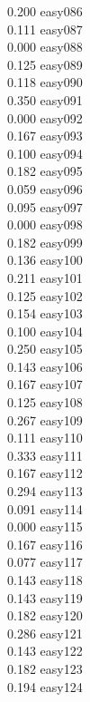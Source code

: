 \documentclass[10pt]{article}
\begin{document}
\begin{enumerate}
\begin{enumerate}
\begin{multicols}{5}
            0.200 easy086\\
            0.111 easy087\\
            0.000 easy088\\
            0.125 easy089\\
            0.118 easy090\\
            0.350 easy091\\
            0.000 easy092\\
            0.167 easy093\\
            0.100 easy094\\
            0.182 easy095\\
            0.059 easy096\\
            0.095 easy097\\
            0.000 easy098\\
            0.182 easy099\\
            0.136 easy100\\
            0.211 easy101\\
            0.125 easy102\\
            0.154 easy103\\
            0.100 easy104\\
            0.250 easy105\\
            0.143 easy106\\
            0.167 easy107\\
            0.125 easy108\\
            0.267 easy109\\
            0.111 easy110\\
            0.333 easy111\\
            0.167 easy112\\
            0.294 easy113\\
            0.091 easy114\\
            0.000 easy115\\
            0.167 easy116\\
            0.077 easy117\\
            0.143 easy118\\
            0.143 easy119\\
            0.182 easy120\\
            0.286 easy121\\
            0.143 easy122\\
            0.182 easy123\\
            0.194 easy124\\

\end{multicols}
\end{enumerate}
\end{enumerate}
\end{document}
